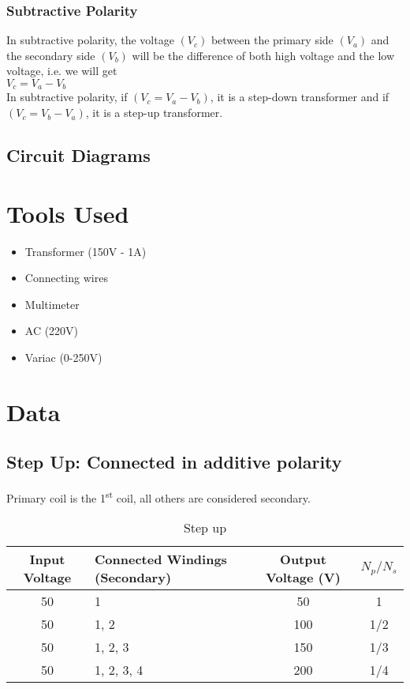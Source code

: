 \documentclass[12pt]{article}
\begin{document}
\subsubsection*{Subtractive Polarity}
In subtractive polarity, the voltage $(V_c)$ between the primary side $(V_a)$ and the secondary side $(V_b)$ will be the difference of both high voltage and the low voltage, i.e. we will get\\ \indent $V_c = V_a - V_b$\\
In subtractive polarity, if $(V_c = V_a - V_b)$, it is a step-down transformer and if $(V_c = V_b - V_a)$, it is a step-up transformer.\cite{polarity}


\subsection{Circuit Diagrams}

\pagebreak
\section{Tools Used}
\begin{itemize}
    \item Transformer (150V - 1A)
    \item Connecting wires
    \item Multimeter
    \item AC (220V)
    \item Variac (0-250V)
\end{itemize}

\section{Data}
\subsection*{Step Up: Connected in additive polarity}
Primary coil is the 1\textsuperscript{st} coil, all others are considered secondary.
\begin{table}[H]
    \centering
    \begin{tabular}{|c|l|c|c|}
        \hline
        Input Voltage & Connected Windings (Secondary) & Output Voltage (V) & $N_p/N_s$ \\
        \hline
        50            & 1                              & 50                 & 1         \\
        \hline
        50            & 1, 2                           & 100                & 1/2       \\
        \hline
        50            & 1, 2, 3                        & 150                & 1/3       \\
        \hline
        50            & 1, 2, 3, 4                     & 200                & 1/4       \\
        \hline
    \end{tabular}
    \caption{Step up}
\end{table}
\end{document}
